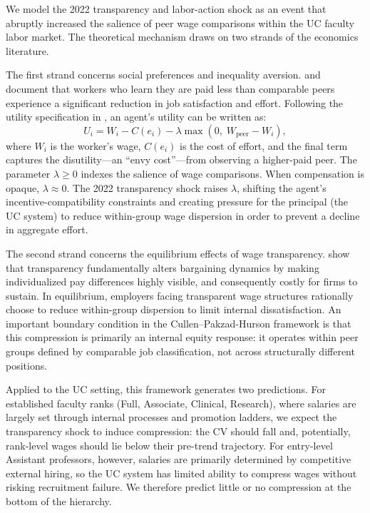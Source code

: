 \documentclass[12pt]{article}
\begin{document}
We model the 2022 transparency and labor-action shock as an event that
abruptly increased the salience of peer wage comparisons within the UC
faculty labor market. The theoretical mechanism draws on two strands of
the economics literature.

The first strand concerns social preferences and inequality aversion.
\citet{bandiera2005} and \citet{card2012} document that workers who
learn they are paid less than comparable peers experience a significant
reduction in job satisfaction and effort. Following the utility
specification in \citet{bandiera2005}, an agent's utility can be
written as:
\begin{equation}
  U_i = W_i - C(e_i) - \lambda\max(0,\; W_{\text{peer}} - W_i),
  \label{eq:utility}
\end{equation}
where $W_i$ is the worker's wage, $C(e_i)$ is the cost of effort, and
the final term captures the disutility---an ``envy cost''---from
observing a higher-paid peer. The parameter $\lambda \geq 0$ indexes the
salience of wage comparisons. When compensation is opaque, $\lambda
\approx 0$. The 2022 transparency shock raises $\lambda$, shifting the
agent's incentive-compatibility constraints and creating pressure for the
principal (the UC system) to reduce within-group wage dispersion in order
to prevent a decline in aggregate effort.

The second strand concerns the equilibrium effects of wage transparency.
\citet{cullen2022} show that transparency fundamentally alters bargaining
dynamics by making individualized pay differences highly visible, and
consequently costly for firms to sustain. In equilibrium, employers
facing transparent wage structures rationally choose to reduce
within-group dispersion to limit internal dissatisfaction. An important
boundary condition in the Cullen--Pakzad-Hurson framework is that this
compression is primarily an internal equity response: it operates within
peer groups defined by comparable job classification, not across
structurally different positions.

Applied to the UC setting, this framework generates two predictions. For
established faculty ranks (Full, Associate, Clinical, Research), where
salaries are largely set through internal processes and promotion
ladders, we expect the transparency shock to induce compression: the CV
should fall and, potentially, rank-level wages should lie below their
pre-trend trajectory. For entry-level Assistant professors, however,
salaries are primarily determined by competitive external hiring, so the
UC system has limited ability to compress wages without risking
recruitment failure. We therefore predict little or no compression at
the bottom of the hierarchy.
\end{document}
